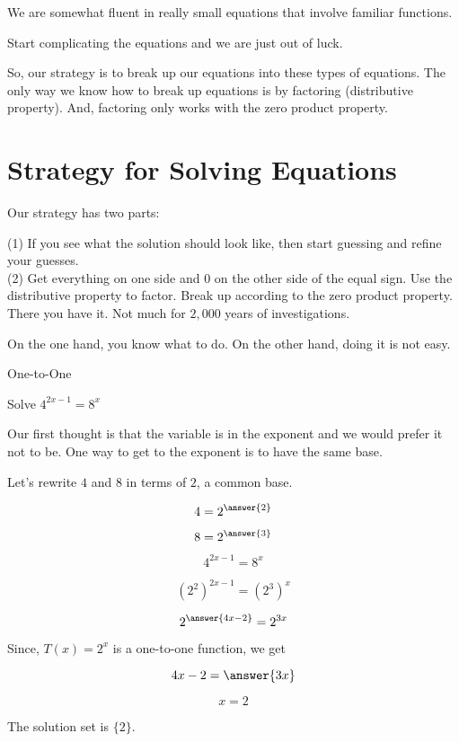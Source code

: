 \documentclass{ximera}
\begin{document}
We are somewhat fluent in really small equations that involve familiar functions.  



Start complicating the equations and we are just out of luck.


So, our strategy is to break up our equations into these types of equations.  The only way we know how to break up equations is by factoring (distributive property).  And, factoring only works with the zero product property.



\section{Strategy for Solving Equations}


Our strategy has two parts:


(1) If you see what the solution should look like, then start guessing and refine your guesses.\\
(2) Get everything on one side and $0$ on the other side of the equal sign. Use the distributive property to factor.  Break up according to the zero product property. \\




There you have it. Not much for $2,000$ years of investigations.

On the one hand, you know what to do.  On the other hand, doing it is not easy.








\begin{example} One-to-One


Solve $4^{2x-1} = 8^x$


Our first thought is that the variable is in the exponent and we would prefer it not to be.  One way to get to the exponent is to have the same base.

Let's rewrite $4$ and $8$ in terms of $2$, a common base.

\[  4 = 2^{\answer{2}} \]

\[  8 = 2^{\answer{3}} \]



\[  4^{2x-1} = 8^x  \]

\[  (2^2)^{2x-1} = (2^3)^x  \]

\[  2^{\answer{4x-2}} = 2^{3x}  \]


Since, $T(x) = 2^x$ is a one-to-one function, we get


\[  4x-2  = \answer{3x}   \]


\[ x = 2 \]

The solution set is $\{ 2 \}$.



\end{example}
\end{document}
